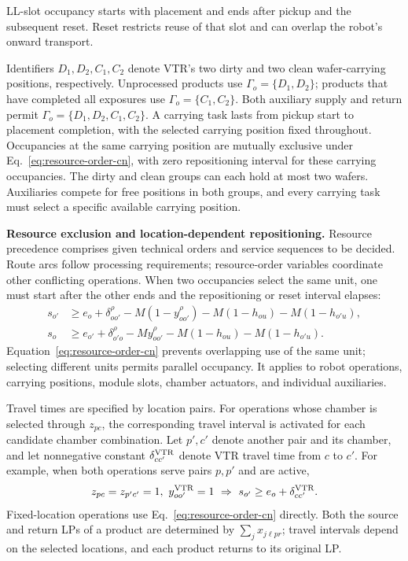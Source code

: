 \documentclass[final,5p,times,twocolumn]{elsarticle}
\begin{document}
LL-slot occupancy starts with placement and ends after pickup and the subsequent reset. Reset restricts reuse of that slot and can overlap the robot's onward transport.

Identifiers $D_1,D_2,C_1,C_2$ denote VTR's two dirty and two clean wafer-carrying positions, respectively. Unprocessed products use $\Gamma_o=\{D_1,D_2\}$; products that have completed all exposures use $\Gamma_o=\{C_1,C_2\}$. Both auxiliary supply and return permit $\Gamma_o=\{D_1,D_2,C_1,C_2\}$. A carrying task lasts from pickup start to placement completion, with the selected carrying position fixed throughout. Occupancies at the same carrying position are mutually exclusive under Eq.~\eqref{eq:resource-order-cn}, with zero repositioning interval for these carrying occupancies. The dirty and clean groups can each hold at most two wafers. Auxiliaries compete for free positions in both groups, and every carrying task must select a specific available carrying position.

\noindent\textbf{Resource exclusion and location-dependent repositioning.}
Resource precedence comprises given technical orders and service sequences to be decided. Route arcs follow processing requirements; resource-order variables coordinate other conflicting operations. When two occupancies select the same unit, one must start after the other ends and the repositioning or reset interval elapses:
\begin{equation}
\begin{aligned}
s_{o'}&\ge e_o+\delta^\rho_{oo'}-M(1-y^\rho_{oo'})
-M(1-h_{ou})-M(1-h_{o'u}),\\
s_o&\ge e_{o'}+\delta^\rho_{o'o}-My^\rho_{oo'}
-M(1-h_{ou})-M(1-h_{o'u}).
\end{aligned}
\label{eq:resource-order-cn}
\end{equation}
Equation~\eqref{eq:resource-order-cn} prevents overlapping use of the same unit; selecting different units permits parallel occupancy. It applies to robot operations, carrying positions, module slots, chamber actuators, and individual auxiliaries.

Travel times are specified by location pairs. For operations whose chamber is selected through $z_{pc}$, the corresponding travel interval is activated for each candidate chamber combination. Let $p',c'$ denote another pair and its chamber, and let nonnegative constant $\delta^{\rm VTR}_{cc'}$ denote VTR travel time from $c$ to $c'$. For example, when both operations serve pairs $p,p'$ and are active,
\begin{equation}
\begin{aligned}
z_{pc}=z_{p'c'}=1,\ y^{\rm VTR}_{oo'}=1
\ \Rightarrow\ s_{o'}\ge e_o+\delta^{\rm VTR}_{cc'}.
\end{aligned}
\label{eq:location-travel-cn}
\end{equation}
Fixed-location operations use Eq.~\eqref{eq:resource-order-cn} directly. Both the source and return LPs of a product are determined by $\sum_jx_{j\ell pr}$; travel intervals depend on the selected locations, and each product returns to its original LP.
\end{document}
